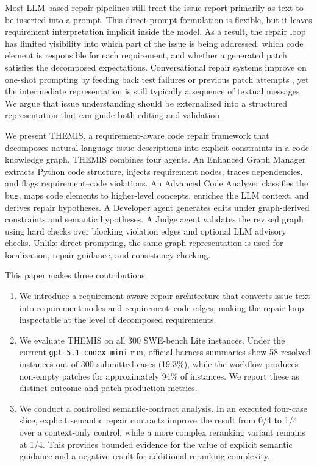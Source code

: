 \documentclass[11pt]{article}
\begin{document}
Most LLM-based repair pipelines still treat the issue report primarily as text to be inserted into a prompt.  This direct-prompt formulation is flexible, but it leaves requirement interpretation implicit inside the model.  As a result, the repair loop has limited visibility into which part of the issue is being addressed, which code element is responsible for each requirement, and whether a generated patch satisfies the decomposed expectations.  Conversational repair systems improve on one-shot prompting by feeding back test failures or previous patch attempts \citep{xia-zhang-2023-conversational-apr,xia-etal-2024-chatrepair}, yet the intermediate representation is still typically a sequence of textual messages.  We argue that issue understanding should be externalized into a structured representation that can guide both editing and validation.

We present \textsc{THEMIS}, a requirement-aware code repair framework that decomposes natural-language issue descriptions into explicit constraints in a code knowledge graph.  THEMIS combines four agents.  An Enhanced Graph Manager extracts Python code structure, injects requirement nodes, traces dependencies, and flags requirement--code violations.  An Advanced Code Analyzer classifies the bug, maps code elements to higher-level concepts, enriches the LLM context, and derives repair hypotheses.  A Developer agent generates edits under graph-derived constraints and semantic hypotheses.  A Judge agent validates the revised graph using hard checks over blocking violation edges and optional LLM advisory checks.  Unlike direct prompting, the same graph representation is used for localization, repair guidance, and consistency checking.

This paper makes three contributions.
\begin{enumerate}
    \item We introduce a requirement-aware repair architecture that converts issue text into requirement nodes and requirement--code edges, making the repair loop inspectable at the level of decomposed requirements.
    \item We evaluate THEMIS on all 300 SWE-bench Lite instances.  Under the current \texttt{gpt-5.1-codex-mini} run, official harness summaries show 58 resolved instances out of 300 submitted cases (19.3\%), while the workflow produces non-empty patches for approximately 94\% of instances.  We report these as distinct outcome and patch-production metrics.
    \item We conduct a controlled semantic-contract analysis.  In an executed four-case slice, explicit semantic repair contracts improve the result from 0/4 to 1/4 over a context-only control, while a more complex reranking variant remains at 1/4.  This provides bounded evidence for the value of explicit semantic guidance and a negative result for additional reranking complexity.
\end{enumerate}
\end{document}
